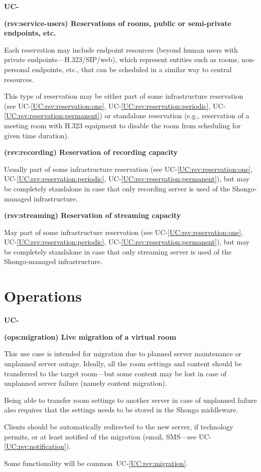 \documentclass[a4paper]{report}
\makeatletter
\newcounter{UCcounter}
\newenvironment{UseCases}%
	{\begin{list}{\textbf{UC-\arabic{UCcounter}}}{\@nmbrlisttrue\def\@listctr{UCcounter}}}%
	{\end{list}}
\newcommand{\UClabel}[1]{\label{UC:#1}}
\newcommand{\UCref}[1]{UC-\ref{UC:#1}}
\newcommand{\UseCase}[2]{\item\UClabel{#2} \textbf{(#2) #1}\\ \nopagebreak}
\makeatother
\begin{document}
\begin{UseCases}
\UseCase{Reservations of rooms, public or semi-private endpoints,
etc.}{rsv:service-users}

Each reservation may include endpoint resources (beyond human users with
private endpoints---H.323/SIP/web), which represent entities such as rooms,
non-personal endpoints, etc., that can be scheduled in a similar way to central
resources.

This type of reservation may be either part of some infrastructure reservation
(see \UCref{rsv:reservation:one}, \UCref{rsv:reservation:periodic},
\UCref{rsv:reservation:permanent}) or standalone reservation (e.g., reservation
of a meeting room with H.323 equipment to disable the room from scheduling for
given time duration).


\UseCase{Reservation of recording capacity}{rsv:recording}

Usually part of some infrastructure reservation (see
\UCref{rsv:reservation:one}, \UCref{rsv:reservation:periodic},
\UCref{rsv:reservation:permanent}), but may be completely standalone in case
that only recording server is used of the Shongo-managed infrastructure.


\UseCase{Reservation of streaming capacity}{rsv:streaming}

May part of some infrastructure reservation (see \UCref{rsv:reservation:one},
\UCref{rsv:reservation:periodic}, \UCref{rsv:reservation:permanent}), but may
be completely standalone in case that only streaming server is used of the
Shongo-managed infrastructure.

\end{UseCases}


\section{Operations}

\begin{UseCases}

\UseCase{Live migration of a virtual room}{ops:migration}

This use case is intended for migration due to planned server maintenance or
unplanned server outage.  Ideally, all the room settings and content should be
transferred to the target room---but some content may be lost in case of
unplanned server failure (namely content migration).

Being able to transfer room settings to another server in case of unplanned
failure also requires that the settings needs to be stored in the Shongo
middleware.

Clients should be automatically redirected to the new server, if technology
permits, or at least notified of the migration (email, SMS---see
\UCref{rsv:notification}).

Some functionality will be common~\UCref{rsv:migration}.

\end{UseCases}
\end{document}

